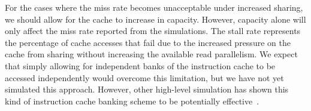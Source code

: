 For the cases where the miss rate becomes unacceptable under increased
sharing, we should allow for the cache to increase in
capacity. 
However, capacity alone will only affect the miss rate reported from
the simulations.
The stall rate represents the percentage of cache accesses that fail
due to the increased pressure on the cache from sharing without
increasing the available read parallelism.
We expect that simply allowing for independent banks of the
instruction cache to be accessed independently would overcome this
limitation, but we have not yet simulated this approach.
However, other high-level simulation has shown this kind of
instruction cache banking scheme to be potentially
effective~\cite{kopta10}. 






